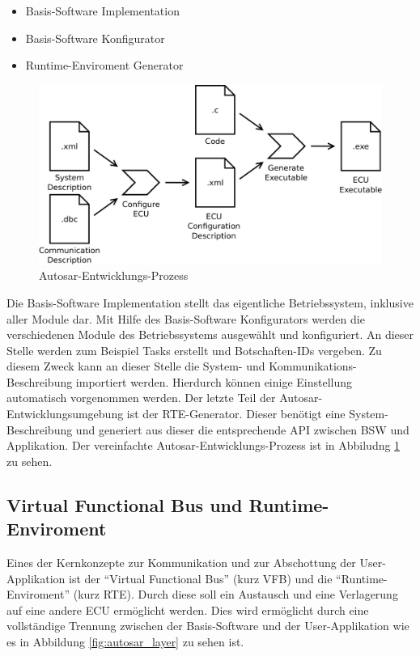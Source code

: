 \documentclass[
  a4paper,					    %
  twoside,
  DIV=calc,     				%
  bibliography=totoc,
  cleardoublepage=empty,
  ngerman,     					%
  final       					%
]{scrbook}
\begin{document}
\begin{itemize}
    \item Basis-Software Implementation
    \item Basis-Software Konfigurator
    \item Runtime-Enviroment Generator
\end{itemize}

\begin{figure}[!htbp]
    \centering
    \includegraphics[width=1\textwidth]{Autosar_Prozess.png}
    \caption{Autosar-Entwicklungs-Prozess}
    \label{fig:autosar_prozess}
\end{figure}

Die Basis-Software Implementation stellt das eigentliche Betriebssystem, inklusive aller Module dar. Mit Hilfe des Basis-Software Konfigurators werden die verschiedenen Module des Betriebssystems ausgewählt und konfiguriert. An dieser Stelle werden zum Beispiel Tasks erstellt und Botschaften-IDs vergeben. Zu diesem Zweck kann an dieser Stelle die System- und Kommunikations-Beschreibung importiert werden. Hierdurch können einige Einstellung automatisch vorgenommen werden. Der letzte Teil der Autosar-Entwicklungsumgebung ist der RTE-Generator. Dieser benötigt eine System-Beschreibung und generiert aus dieser die entsprechende API zwischen BSW und Applikation. Der vereinfachte Autosar-Entwicklungs-Prozess ist in Abbiludng \ref{fig:autosar_prozess} zu sehen.



\subsection{Virtual Functional Bus und Runtime-Enviroment}
\label{sec:vfb}
Eines der Kernkonzepte zur Kommunikation und zur Abschottung der User-Applikation ist der "`Virtual Functional Bus"' (kurz VFB) und die "`Runtime-Enviroment"' (kurz RTE). Durch diese soll ein Austausch und eine Verlagerung auf eine andere ECU ermöglicht werden. Dies wird ermöglicht durch eine vollständige Trennung zwischen der Basis-Software und der User-Applikation wie es in Abbildung \ref{fig:autosar_layer} zu sehen ist. 
\end{document}
